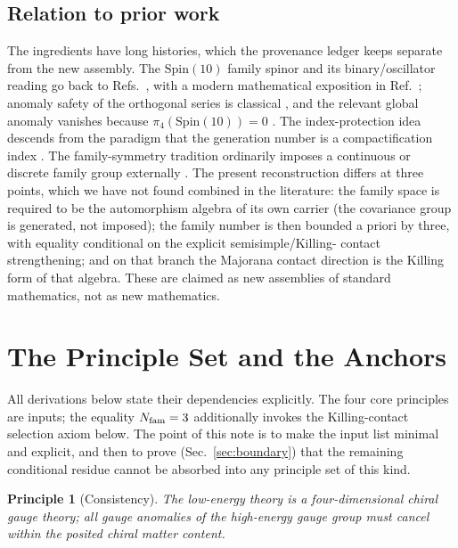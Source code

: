 \documentclass[
  aps,
  prd,
  preprint,
  nofootinbib,
  superscriptaddress,
  longbibliography
]{revtex4-2}
\newcommand{\Spin}{\mathrm{Spin}}
\newtheorem{principle}[theorem]{Principle}
\begin{document}
\subsection{Relation to prior work}
\label{sec:prior}

The ingredients have long histories, which the provenance ledger keeps
separate from the new assembly.  The \(\Spin(10)\) family spinor and its
binary/oscillator reading go back to
Refs.~\cite{Georgi1975,FritzschMinkowski1975}, with a modern mathematical
exposition in Ref.~\cite{BaezHuerta2010}; anomaly safety of the orthogonal
series is classical \cite{GeorgiGlashow1972,Okubo1977}, and the relevant
global anomaly vanishes because \(\pi_4(\Spin(10))=0\)
\cite{WittenSU2Anomaly1982}.  The index-protection idea descends from the
paradigm that the generation number is a compactification index
\cite{CandelasHorowitzStromingerWitten1985}.  The family-symmetry tradition
ordinarily imposes a continuous or discrete family group externally
\cite{KingLuhn2013}.  The present reconstruction differs at three points,
which we have not found combined in the literature: the family space is
required to be the automorphism algebra of its own carrier (the covariance
group is generated, not imposed); the family number is then bounded a
priori by three, with equality conditional on the explicit semisimple/Killing-
contact strengthening; and on that branch the Majorana contact direction is
the Killing form of that algebra.  These are
claimed as new assemblies of standard mathematics, not as new mathematics.

\section{The Principle Set and the Anchors}
\label{sec:principles}

All derivations below state their dependencies explicitly.  The four core
principles are inputs; the equality \(N_{\rm fam}=3\) additionally invokes
the Killing-contact selection axiom below.  The point of this note is to make
the input list minimal and explicit, and then to prove
(Sec.~\ref{sec:boundary}) that the remaining conditional residue cannot be
absorbed into any principle set of this kind.

\begin{principle}[Consistency]
\label{pr:consistency}
The low-energy theory is a four-dimensional chiral gauge theory; all gauge
anomalies of the high-energy gauge group must cancel within the posited
chiral matter content.
\end{principle}
\end{document}
